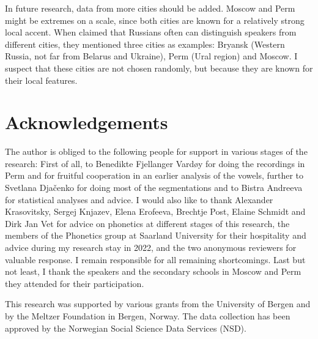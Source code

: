 \documentclass[output=paper]{langscibook}
\begin{document}
In future research, data from more cities should be added. Moscow and Perm might be extremes on a scale, since both cities are known for a relatively strong local accent. When \citet{GrammatčikovaPožarickaja2013} claimed that Russians often can distinguish speakers from different cities, they mentioned three cities as examples: Bryansk (Western Russia, not far from Belarus and Ukraine), Perm (Ural region) and Moscow. I suspect that these cities are not chosen randomly, but because they are known for their local features.


\section*{Acknowledgements}

The author is obliged to the following people for support in various stages of the research: First of all, to Benedikte Fjellanger Vardøy for doing the recordings in Perm and for fruitful cooperation in an earlier analysis of the vowels, further to Svetlana Djačenko for doing most of the segmentations and to Bistra Andreeva for statistical analyses and advice. I would also like to thank Alexander Krasovitsky, Sergej Knjazev, Elena Erofeeva, Brechtje Post, Elaine Schmidt and Dirk Jan Vet for advice on phonetics at different stages of this research, the members of the Phonetics group at Saarland University for their hospitality and advice during my research stay in 2022, and the two anonymous reviewers for valuable response. I remain responsible for all remaining shortcomings. Last but not least, I thank the speakers and the secondary schools in Moscow and Perm they attended for their participation. 



This research was supported by various grants from the University of Bergen and by the Meltzer Foundation in Bergen, Norway. The data collection has been approved by the Norwegian Social Science Data Services (NSD).


\sloppy\printbibliography[heading=subbibliography,notkeyword=this]
\end{document}
